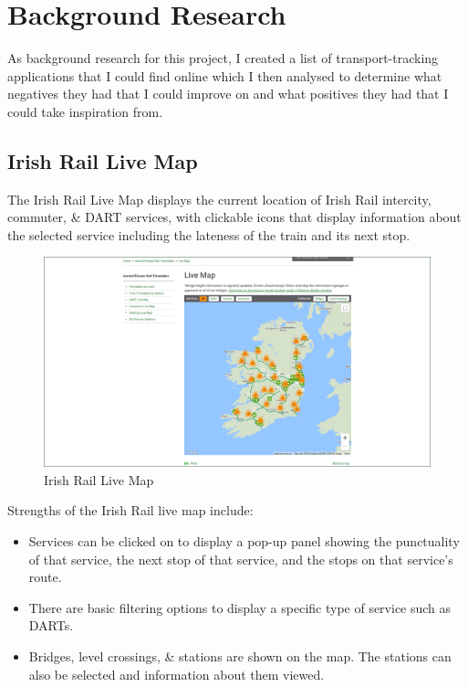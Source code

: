 \documentclass[a4paper,11pt]{article}
\begin{document}
\section{Background Research}
As background research for this project, I created a list of transport-tracking applications that I could find online which I then analysed to determine what negatives they had that I could improve on and what positives they had that I could take inspiration from.

\subsection{Irish Rail Live Map}
The Irish Rail Live Map\supercite{liveir} displays the current location of Irish Rail intercity, commuter, \& DART services, with clickable icons that display information about the selected service including the lateness of the train and its next stop.
\begin{figure}[H]
    \centering
    \includegraphics[width=\textwidth]{./images/irlive.png}
    \caption{Irish Rail Live Map}
\end{figure}

Strengths of the Irish Rail live map include:
\begin{itemize}
    \item   Services can be clicked on to display a pop-up panel showing the punctuality of that service, the next stop of that service, and the stops on that service's route.
    \item   There are basic filtering options to display a specific type of service such as DARTs.
    \item   Bridges, level crossings, \& stations are shown on the map.
            The stations can also be selected and information about them viewed.
\end{itemize}
\end{document}
